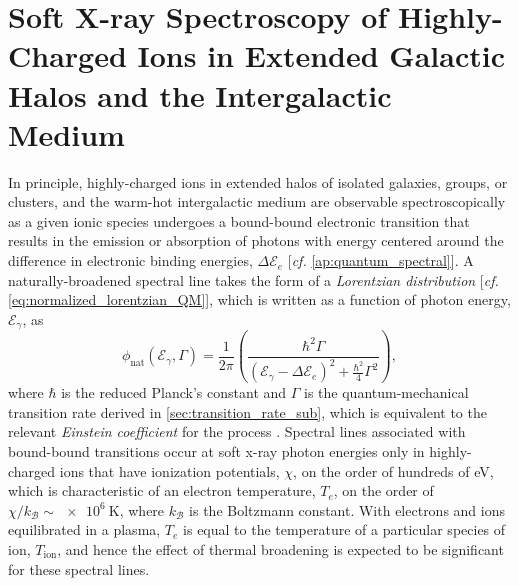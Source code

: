 \section{Soft X-ray Spectroscopy of Highly-Charged Ions in Extended Galactic Halos and the Intergalactic Medium}\label{sec:astro_plasmas}
In principle, highly-charged ions in extended halos of isolated galaxies, groups, or clusters, and the warm-hot intergalactic medium are observable spectroscopically as a given ionic species undergoes a bound-bound electronic transition that results in the emission or absorption of photons with energy centered around the difference in electronic binding energies, $\Delta \mathcal{E}_e$ [\emph{cf.\@} \cref{ap:quantum_spectral}]. 
A naturally-broadened spectral line takes the form of a \emph{Lorentzian distribution} [\emph{cf.\@} \cref{eq:normalized_lorentzian_QM}], which is written as a function of photon energy, $\mathcal{E}_{\gamma}$, as 
\begin{equation}\label{eq:Lorentzian_1} 
 \phi_{\text{nat}} \left( \mathcal{E}_{\gamma} , \Gamma \right) = \frac{1}{2 \pi} \left( \frac{\hbar^2 \Gamma}{\left(\mathcal{E}_{\gamma} - \Delta \mathcal{E}_e \right)^2 + \frac{\hbar^2}{4} \Gamma^2} \right) ,
 \end{equation}
where $\hbar$ is the reduced Planck's constant and $\Gamma$ is the quantum-mechanical transition rate derived in \cref{sec:transition_rate_sub}, which is equivalent to the relevant \emph{Einstein coefficient} for the process \cite{Rybicki86}. 
Spectral lines associated with bound-bound transitions occur at soft x-ray photon energies only in highly-charged ions that have ionization potentials, $\chi$, on the order of hundreds of \si{\electronvolt}, which is characteristic of an electron temperature, $T_e$, on the order of $\chi / k_{\mathcal{B}} \sim \SI{e6}{\kelvin}$, where $k_{\mathcal{B}}$ is the Boltzmann constant. 
With electrons and ions equilibrated in a plasma, $T_e$ is equal to the temperature of a particular species of ion, $T_{\text{ion}}$, and hence the effect of thermal broadening is expected to be significant for these spectral lines. 
